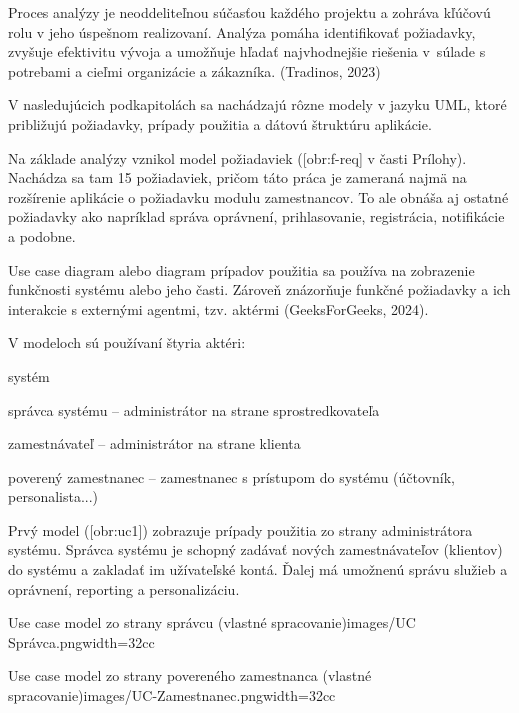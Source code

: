 Proces analýzy je neoddeliteľnou súčasťou každého projektu a zohráva kľúčovú rolu v jeho úspešnom realizovaní. Analýza pomáha identifikovať požiadavky, zvyšuje efektivitu vývoja a umožňuje hľadať najvhodnejšie riešenia v~súlade s potrebami a cieľmi organizácie a zákazníka. (Tradinos, 2023)

V nasledujúcich podkapitolách sa nachádzajú rôzne modely v jazyku UML, ktoré približujú požiadavky, prípady použitia a dátovú štruktúru aplikácie.

Na základe analýzy vznikol model požiadaviek ([obr:f-req] v časti Prílohy). Nachádza sa tam 15 požiadaviek, pričom táto práca je zameraná najmä na rozšírenie aplikácie o požiadavku modulu zamestnancov. To ale obnáša aj ostatné požiadavky ako napríklad správa oprávnení, prihlasovanie, registrácia, notifikácie a podobne.


Use case diagram alebo diagram prípadov použitia sa používa na zobrazenie funkčnosti systému alebo jeho časti. Zároveň znázorňuje funkčné požiadavky a ich interakcie s externými agentmi, tzv. aktérmi \scr(GeeksForGeeks, 2024).

\blank
V modeloch sú používaní štyria aktéri:

\startitemize
\item{systém}
\item{správca systému -- administrátor na strane sprostredkovateľa}
\item{zamestnávateľ -- administrátor na strane klienta}
\item{poverený zamestnanec -- zamestnanec s prístupom do systému (účtovník, personalista...)}
\stopitemize 

Prvý model ([obr:uc1]) zobrazuje prípady použitia zo strany administrátora systému.  Správca systému je schopný zadávať nových zamestnávateľov (klientov) do systému a zakladať im užívateľské kontá. Ďalej má umožnenú správu služieb a oprávnení, reporting a personalizáciu.

{Use case model zo strany správcu (vlastné spracovanie)}{images/UC Správca.png}{width=32cc}


{Use case model zo strany povereného zamestnanca (vlastné spracovanie)}{images/UC-Zamestnanec.png}{width=32cc}

